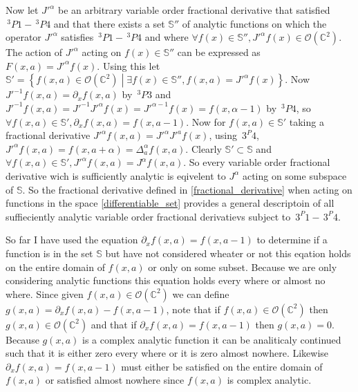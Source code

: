 \documentclass[%
 onecolumn,
 amsmath, amssymb, aps, pra, 10pt
]{revtex4-2}
\begin{document}
Now let $J'^{\alpha}$ be an arbitrary variable order fractional derivative that satisfied $\,^3P1 - \,^3P4$ and that there exists a set $\mathbb{S}''$ of analytic functions on which the operator $J'^{\alpha}$ satisfies $\,^3P1 - \,^3P4$ and where $\forall f(x) \in \mathbb{S}'', J'^{\alpha}f(x) \in \mathcal{O}(\mathbb{C}^2)$. The action of $J'^{\alpha}$ acting on $f(x) \in \mathbb{S}''$ can be expressed as $F(x, a) = J'^{\alpha} f(x)$. Using this let $\mathbb{S}' = \left\lbrace f(x, a) \in \mathcal{O}(\mathbb{C}^2) \middle| \exists f(x) \in \mathbb{S}'', f(x, a) = J'^{\alpha} f(x) \right\rbrace$. Now $J'^{-1}f(x, a) = \partial_x f(x, a)$ by $\,^3P3$ and $J'^{-1} f(x, a) = J'^{-1}J'^{\alpha} f(x) = J'^{\alpha - 1} f(x) = f(x, \alpha - 1)$ by $\,^3P4$, so $\forall f(x, a) \in \mathbb{S}', \partial_x f(x, a) = f(x, a - 1)$. Now for $f(x, a) \in \mathbb{S}'$ taking a fractional derivative $J'^{\alpha} f(x, a) = J'^{\alpha}J'^{a} f(x)$, using $\,3^P4$, $J'^{\alpha} f(x, a) = f(x, a + \alpha) = \Delta_{a}^{\alpha} f(x, a)$. Clearly $\mathbb{S}' \subset \mathbb{S}$ and $\forall f(x, a) \in \mathbb{S}', J'^{\alpha} f(x, a) = J^{\alpha} f(x, a)$. So every variable order fractional derivative wich is sufficiently analytic is eqivelent to $J^{\alpha}$ acting on some subspace of $\mathbb{S}$. So the fractional derivative defined in \eqref{fractional_derivative} when acting on functions in the space \eqref{differentiable_set} provides a general descriptoin of all suffieciently analytic variable order fractional derivatievs subject to $\,3^P1 - \,3^P4$.

So far I have used the equation $\partial_x f(x, a) = f(x, a - 1)$ to determine if a function is in the set $\mathbb{S}$ but have not considered wheater or not this eqation holds on the entire domain of $f(x, a)$ or only on some subset. Because we are only considering analytic functions this equation holds every where or almost no where. Since given $f(x, a) \in \mathcal{O}(\mathbb{C}^2)$ we can define $g(x, a) = \partial_x f(x, a) - f(x, a - 1)$, note that if $f(x, a) \in \mathcal{O}(\mathbb{C}^2)$ then $g(x, a) \in \mathcal{O}(\mathbb{C}^2)$ and that if $\partial_x f(x, a) = f(x, a - 1)$ then $g(x, a) = 0$. Because $g(x, a)$ is a complex analytic function it can be analiticaly continued such that it is either zero every where or it is zero almost nowhere. Likewise $\partial_x f(x, a) = f(x, a - 1)$ must either be satisfied on the entire domain of $f(x, a)$ or satisfied almost nowhere since $f(x, a)$ is complex analytic.
\end{document}
